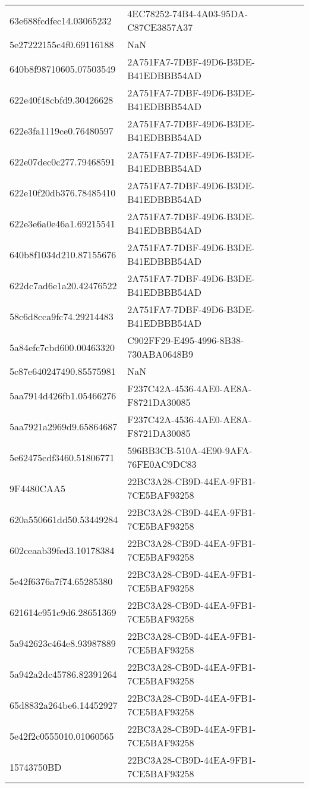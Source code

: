 \begin{tabular}{ll}
63e688fcdfec14.03065232 & 4EC78252-74B4-4A03-95DA-C87CE3857A37 \\
5e27222155c4f0.69116188 & NaN \\
640b8f98710605.07503549 & 2A751FA7-7DBF-49D6-B3DE-B41EDBBB54AD \\
622e40f48cbfd9.30426628 & 2A751FA7-7DBF-49D6-B3DE-B41EDBBB54AD \\
622e3fa1119ce0.76480597 & 2A751FA7-7DBF-49D6-B3DE-B41EDBBB54AD \\
622e07dec0c277.79468591 & 2A751FA7-7DBF-49D6-B3DE-B41EDBBB54AD \\
622e10f20db376.78485410 & 2A751FA7-7DBF-49D6-B3DE-B41EDBBB54AD \\
622e3e6a0e46a1.69215541 & 2A751FA7-7DBF-49D6-B3DE-B41EDBBB54AD \\
640b8f1034d210.87155676 & 2A751FA7-7DBF-49D6-B3DE-B41EDBBB54AD \\
622dc7ad6e1a20.42476522 & 2A751FA7-7DBF-49D6-B3DE-B41EDBBB54AD \\
58c6d8cca9fc74.29214483 & 2A751FA7-7DBF-49D6-B3DE-B41EDBBB54AD \\
5a84efc7cbd600.00463320 & C902FF29-E495-4996-8B38-730ABA0648B9 \\
5c87e640247490.85575981 & NaN \\
5aa7914d426fb1.05466276 & F237C42A-4536-4AE0-AE8A-F8721DA30085 \\
5aa7921a2969d9.65864687 & F237C42A-4536-4AE0-AE8A-F8721DA30085 \\
5e62475cdf3460.51806771 & 596BB3CB-510A-4E90-9AFA-76FE0AC9DC83 \\
9F4480CAA5 & 22BC3A28-CB9D-44EA-9FB1-7CE5BAF93258 \\
620a550661dd50.53449284 & 22BC3A28-CB9D-44EA-9FB1-7CE5BAF93258 \\
602ceaab39fed3.10178384 & 22BC3A28-CB9D-44EA-9FB1-7CE5BAF93258 \\
5e42f6376a7f74.65285380 & 22BC3A28-CB9D-44EA-9FB1-7CE5BAF93258 \\
621614e951c9d6.28651369 & 22BC3A28-CB9D-44EA-9FB1-7CE5BAF93258 \\
5a942623c464e8.93987889 & 22BC3A28-CB9D-44EA-9FB1-7CE5BAF93258 \\
5a942a2dc45786.82391264 & 22BC3A28-CB9D-44EA-9FB1-7CE5BAF93258 \\
65d8832a264be6.14452927 & 22BC3A28-CB9D-44EA-9FB1-7CE5BAF93258 \\
5e42f2c0555010.01060565 & 22BC3A28-CB9D-44EA-9FB1-7CE5BAF93258 \\
15743750BD & 22BC3A28-CB9D-44EA-9FB1-7CE5BAF93258 \\

\end{tabular}
